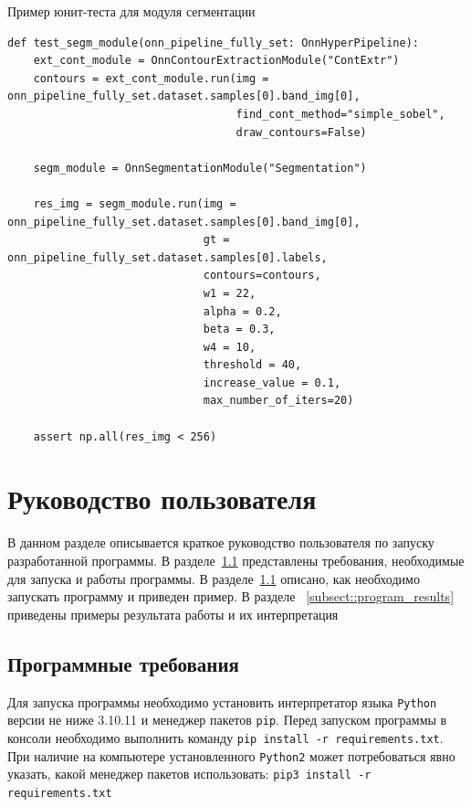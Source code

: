 \documentclass[14pt, russian]{scrartcl}
\begin{document}
\begin{listing}[H]
    \caption{Пример юнит-теста для модуля сегментации}
    \label{lst:contour_extr_sobel}
    \begin{verbatim}
def test_segm_module(onn_pipeline_fully_set: OnnHyperPipeline):
    ext_cont_module = OnnContourExtractionModule("ContExtr")
    contours = ext_cont_module.run(img = onn_pipeline_fully_set.dataset.samples[0].band_img[0], 
                                   find_cont_method="simple_sobel",
                                   draw_contours=False)

    segm_module = OnnSegmentationModule("Segmentation")

    res_img = segm_module.run(img = onn_pipeline_fully_set.dataset.samples[0].band_img[0],
                              gt = onn_pipeline_fully_set.dataset.samples[0].labels,
                              contours=contours,
                              w1 = 22,
                              alpha = 0.2,
                              beta = 0.3,
                              w4 = 10,
                              threshold = 40,
                              increase_value = 0.1,
                              max_number_of_iters=20)

    assert np.all(res_img < 256)
    \end{verbatim}
\end{listing}

\section{Руководство пользователя}

В данном разделе описывается краткое руководство пользователя по запуску разработанной программы. В разделе~\ref{subsect::program_req} представлены требования, 
необходимые для запуска и работы программы. В разделе~\ref{subsect::program_req} описано, как необходимо запускать программу и приведен пример. В разделе
~\ref{subsect::program_results} приведены примеры результата работы и их интерпретация

\subsection{Программные требования}\label{subsect::program_req}

Для запуска программы необходимо установить интерпретатор языка \texttt{Python} версии не ниже 3.10.11 и менеджер пакетов \texttt{pip}.
Перед запуском программы в консоли необходимо выполнить команду \texttt{pip install -r requirements.txt}. При наличие на компьютере установленного \texttt{Python2} 
может потребоваться явно указать, какой менеджер пакетов использовать: \texttt{pip3 install -r requirements.txt}
\end{document}
